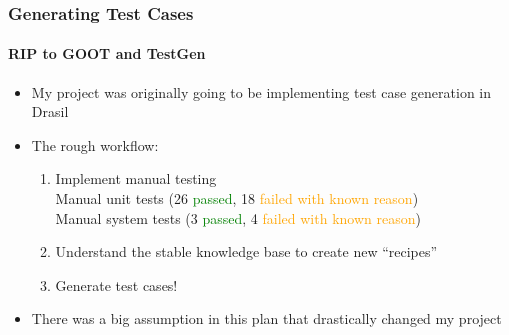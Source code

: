 \begin{frame}
    \frametitle{Generating Test Cases}
    \framesubtitle{RIP to GOOT and TestGen}
    \begin{itemize}
        \item My project was originally going to be implementing
              test case generation in Drasil
        \item<2-> The rough workflow:
              \begin{enumerate}
                  \item<2-> Implement manual testing \\
                        Manual unit tests (26 \textcolor{green}{passed},
                        18 \textcolor{orange}{failed with known reason}) \\
                        Manual system tests (3 \textcolor{green}{passed},
                        4 \textcolor{orange}{failed with known reason})
                  \item<3-> Understand the {stable
                                knowledge base} to create new ``recipes''
                  \item<4-> Generate test cases!
              \end{enumerate}
        \item<5-> There was a big assumption in this plan that drastically
              changed my project
    \end{itemize}
\end{frame}

